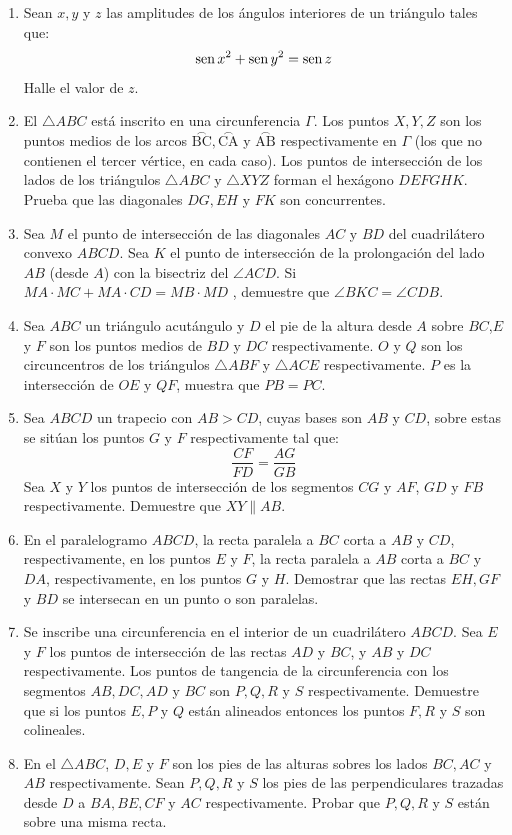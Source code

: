 \documentclass{book}
\newcommand{\sen}{\mathop{\rm sen}\nolimits} %
\begin{document}
\begin{enumerate}
			\item Sean $x,y$ y $z$ las amplitudes de los ángulos interiores de un triángulo tales que: 
			$$\sen{x^2}+\sen{y^2}=\sen{z}$$
Halle el valor de $z$. 
			\item El $\triangle ABC$ está inscrito en una circunferencia $\Gamma$. Los puntos $X,Y,Z$ son los puntos medios de los arcos $\stackrel{\textstyle\frown}{\mathrm{BC}},\stackrel{\textstyle\frown}{\mathrm{CA}}$ y  $\stackrel{\textstyle\frown}{\mathrm{AB}}$ respectivamente en $\Gamma$ (los que no contienen el tercer vértice, en cada caso). Los puntos de intersección de los lados de los triángulos $\triangle ABC$ y $\triangle XYZ$ forman el hexágono $DEFGHK$. Prueba que las diagonales $DG,EH$ y $FK$ son concurrentes. 
			\item Sea $M$ el punto de intersección de las diagonales $AC$ y $BD$ del cuadrilátero convexo $ABCD$. Sea $K$ el punto de intersección de la prolongación del lado $AB$ (desde $A$) con la bisectriz del $\angle ACD$. Si $MA\cdot MC + MA\cdot CD =MB \cdot MD$ , demuestre que $\angle BKC = \angle CDB$. 
			\item Sea $ABC$ un triángulo acutángulo y $D$ el pie de la altura desde $A$ sobre $BC$,$E$ y $F$ son los puntos medios de $BD$ y $DC$ respectivamente. $O$ y $Q$ son los circuncentros de los triángulos $\triangle ABF$ y $\triangle ACE$ respectivamente. $P$ es la intersección de $OE$ y $QF$, muestra que $PB=PC$. 
			\item Sea $ABCD$ un trapecio con $AB > CD$, cuyas bases son $AB$ y $CD$, sobre estas se sitúan los puntos $G$ y $F$ respectivamente tal que: 
			$$\frac{CF}{FD}=\frac{AG}{GB}$$
 Sea $X$ y $Y$ los puntos de intersección de los segmentos $CG$ y $AF$, $GD$ y $FB$ respectivamente. Demuestre que $XY \parallel AB$. 
 			\item En el paralelogramo $ABCD$, la recta paralela a $BC$ corta a $AB$ y $CD$, respectivamente, en los puntos $E$ y $F$, la recta paralela a $AB$ corta a $BC$ y $DA$, respectivamente, en los puntos $G$ y $H$. Demostrar que las rectas $EH,GF$ y $BD$ se intersecan en un punto o son paralelas. 
 			\item Se inscribe una circunferencia en el interior de un cuadrilátero $ABCD$. Sea $E$ y $F$ los puntos de intersección de las rectas $AD$ y $BC$, y $AB$ y $DC$ respectivamente. Los puntos de tangencia de la circunferencia con los segmentos $AB,DC,AD$ y $BC$ son $P,Q,R$ y $S$ respectivamente. Demuestre que si los puntos $E,P$ y $Q$ están alineados entonces los puntos $F,R$ y $S$ son colineales. 
 			\item En el $\triangle ABC$, $D ,E$ y $F$ son los pies de las alturas sobres los lados $BC,AC$ y $AB$ respectivamente. Sean $P,Q,R$ y $S$ los pies de las perpendiculares trazadas desde $D$ a $BA, BE, CF$ y $AC$ respectivamente. Probar que $P, Q, R$ y $S$ están sobre una misma recta. 

\end{enumerate}
\end{document}
